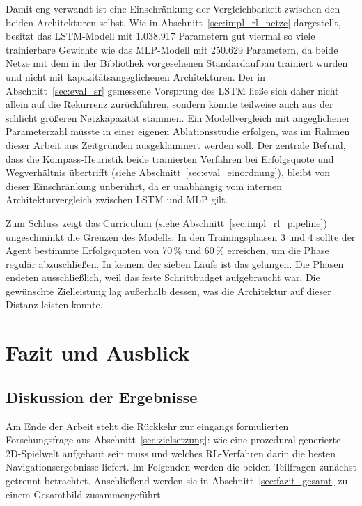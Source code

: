 \documentclass[
  a4paper,
  11pt,
  twoside,
  BCOR=8mm,           %
  headings=big,
  numbers=noenddot,
  listof=totoc,       %
  captions=tableheading,
]{scrreprt}
\begin{document}
Damit eng verwandt ist eine Einschränkung der Vergleichbarkeit zwischen den beiden Architekturen selbst. Wie in Abschnitt~\ref{sec:impl_rl_netze} dargestellt, besitzt das LSTM-Modell mit 1.038.917 Parametern gut viermal so viele trainierbare Gewichte wie das MLP-Modell mit 250.629 Parametern, da beide Netze mit dem in der Bibliothek vorgesehenen Standardaufbau trainiert wurden und nicht mit kapazitätsangeglichenen Architekturen. Der in Abschnitt~\ref{sec:eval_sr} gemessene Vorsprung des LSTM ließe sich daher nicht allein auf die Rekurrenz zurückführen, sondern könnte teilweise auch aus der schlicht größeren Netzkapazität stammen. Ein Modellvergleich mit angeglichener Parameterzahl müsste in einer eigenen Ablationsstudie erfolgen, was im Rahmen dieser Arbeit aus Zeitgründen ausgeklammert werden soll. Der zentrale Befund, dass die Kompass-Heuristik beide trainierten Verfahren bei Erfolgsquote und Wegverhältnis übertrifft (siehe Abschnitt~\ref{sec:eval_einordnung}), bleibt von dieser Einschränkung unberührt, da er unabhängig vom internen Architekturvergleich zwischen LSTM und MLP gilt.

Zum Schluss zeigt das Curriculum (siehe Abschnitt~\ref{sec:impl_rl_pipeline}) ungeschminkt die Grenzen des Modells: In den Trainingsphasen 3 und 4 sollte der Agent bestimmte Erfolgsquoten von 70\,\% und 60\,\% erreichen, um die Phase regulär abzuschließen. In keinem der sieben Läufe ist das gelungen. Die Phasen endeten ausschließlich, weil das feste Schrittbudget aufgebraucht war. Die gewünschte Zielleistung lag außerhalb dessen, was die Architektur auf dieser Distanz leisten konnte.

\chapter{Fazit und Ausblick}
\label{chap:fazit}

\section{Diskussion der Ergebnisse}
\label{sec:fazit_ergebnisse}
Am Ende der Arbeit steht die Rückkehr zur eingangs formulierten Forschungsfrage aus Abschnitt~\ref{sec:zielsetzung}: wie eine prozedural generierte 2D-Spielwelt aufgebaut sein muss und welches RL-Verfahren darin die besten Navigationsergebnisse liefert. Im Folgenden werden die beiden Teilfragen zunächst getrennt betrachtet. Anschließend werden sie in Abschnitt~\ref{sec:fazit_gesamt} zu einem Gesamtbild zusammengeführt.
\end{document}
